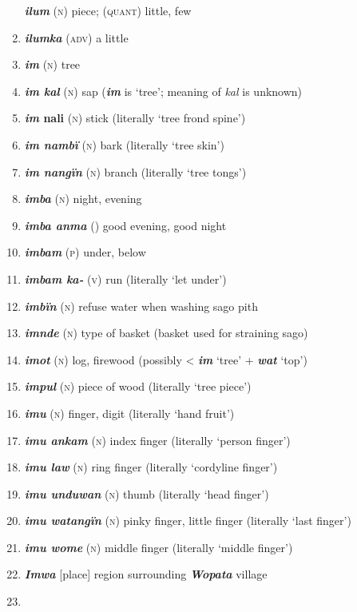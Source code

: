 \begin{enumerate}[noitemsep, label={}, align=left, widest=190, labelsep=1ex,leftmargin=*,itemindent=-10pt]
\textbf{\textit{ilum}} (\textsc{n}) piece; (\textsc{quant}) little, few \item 
\textbf{\textit{ilumka}} (\textsc{adv}) a little \item 
\textbf{\textit{im}} (\textsc{n}) tree \item 
\textbf{\textit{im kal}} (\textsc{n}) sap (\textbf{\textit{im}} is ‘tree’; meaning of \textit{kal} is unknown) \item 
\textbf{\textit{im} \textbf{nali}} (\textsc{n}) stick (literally ‘tree frond spine’) \item 
\textbf{\textit{im nambï}} (\textsc{n}) bark (literally ‘tree skin’) \item 
\textbf{\textit{im nangïn}} (\textsc{n}) branch (literally ‘tree tongs’) \item 
\textbf{\textit{imba}} (\textsc{n}) night, evening \item 
\textbf{\textit{imba anma}} () good evening, good night \item 
\textbf{\textit{imbam}} (\textsc{p}) under, below \item 
\textbf{\textit{imbam ka-}} (\textsc{v}) run (literally ‘let under’) \item 
\textbf{\textit{imbïn}} (\textsc{n}) refuse water when washing sago pith \item 
\textbf{\textit{imnde}} (\textsc{n}) type of basket (basket used for straining sago) \item 
\textbf{\textit{imot}} (\textsc{n}) log, firewood (possibly < \textbf{\textit{im}} ‘tree’ + \textbf{\textit{wat}} ‘top’) \item 
\textbf{\textit{impul}} (\textsc{n}) piece of wood (literally ‘tree piece’) \item 
\textbf{\textit{imu}} (\textsc{n}) finger, digit (literally ‘hand fruit’) \item 
\textbf{\textit{imu ankam}} (\textsc{n}) index finger (literally ‘person finger’) \item 
\textbf{\textit{imu law}} (\textsc{n}) ring finger (literally ‘cordyline finger’) \item 
\textbf{\textit{imu unduwan}} (\textsc{n}) thumb (literally ‘head finger’) \item 
\textbf{\textit{imu watangïn}} (\textsc{n}) pinky finger, little finger (literally ‘last finger’) \item 
\textbf{\textit{imu wome}} (\textsc{n}) middle finger (literally ‘middle finger’) \item 
\textbf{\textit{Imwa}} [place] region surrounding \textbf{\textit{Wopata}} village \item 

\end{enumerate}
